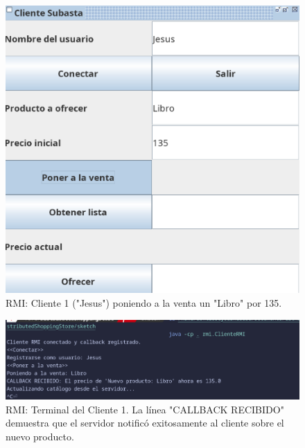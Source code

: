 \documentclass[11pt, a4paper]{article}
\begin{document}
\begin{figure}[h!]
    \centering
    \includegraphics[width=0.7\linewidth]{media/rmi-screenshots/Sell-Item-Client1.png}
    \caption{RMI: Cliente 1 ("Jesus") poniendo a la venta un "Libro" por 135.}
    \label{fig:rmi_vender_gui}
\end{figure}

\begin{figure}[h!]
    \centering
    \includegraphics[width=0.9\linewidth]{media/rmi-screenshots/Sell-Item-Terminal-Client-1.png}
    \caption{RMI: Terminal del Cliente 1. La línea "CALLBACK RECIBIDO" demuestra que el servidor notificó exitosamente al cliente sobre el nuevo producto.}
    \label{fig:rmi_vender_term}
\end{figure}
\end{document}
